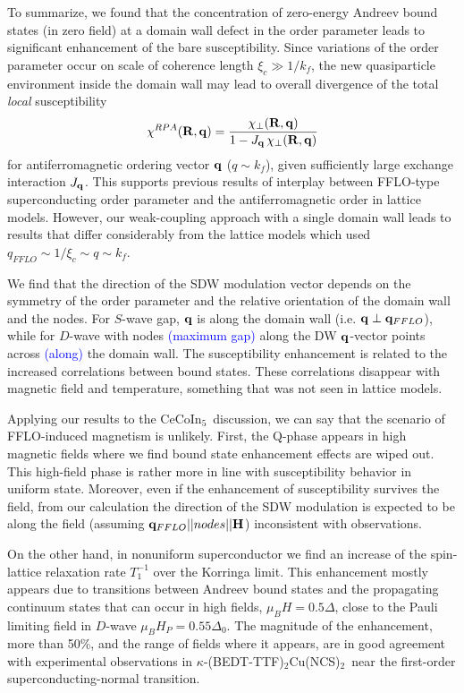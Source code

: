 \documentclass[prb,aps,showpacs,amsmath,twocolumn,10pt]{revtex4-1}
\newcommand{\blue}{\textcolor{blue}}
\newcommand{\red}{\textcolor{red}}
\newcommand{\cecoin}{CeCoIn$_5$}
\newcommand{\kbtf}{$\kappa$-(BEDT-TTF)$_2$Cu(NCS)$_2$}
\begin{document}
To summarize, we found that the concentration of zero-energy Andreev bound states (in zero field) at a domain wall 
defect in the order parameter leads to significant enhancement of the bare 
susceptibility. Since variations of the order parameter occur on scale of coherence length $\xi_c \gg 1/k_f$, 
the new quasiparticle environment inside the domain wall may lead to overall divergence of the total 
\emph{local} susceptibility
$$
\chi^{RPA}({\bf R},{\bf q}) = \frac{ \chi_\perp({\bf R},{\bf q})}{1 - J_{\bf q} \, \chi_\perp({\bf R},{\bf q}) }
$$
for antiferromagnetic ordering vector ${\bf q}$ ($q \sim k_f$), given sufficiently 
large exchange interaction $J_{\bf q}$. This supports previous results of interplay between FFLO-type  
superconducting order parameter and the antiferromagnetic order in lattice models.\cite{Yanase2009abs,Marcin2009}
However, our weak-coupling approach with a single domain wall leads to results that differ 
considerably from the lattice models which used $q_{FFLO} \sim 1/\xi_c \sim q \sim k_f$. 

We find that the direction of the SDW modulation vector depends on the symmetry of 
the order parameter and the relative orientation of the domain wall and the nodes. 
For $S$-wave gap, ${\bf q}$ is along the domain wall (i.e. ${\bf q} \perp {\bf q}_{FFLO}$), 
while for $D$-wave with nodes \blue{(maximum gap)} along the DW ${\bf q}$-vector points across \blue{(along)} the domain wall. 
The susceptibility enhancement is related to the increased correlations between 
bound states. 
These correlations disappear with magnetic field and temperature, something that was not seen in lattice models. 

Applying our results to the \cecoin\ discussion, we can say that the scenario of FFLO-induced magnetism 
is unlikely. First, the Q-phase appears in high magnetic fields\cite{cecoin5_Kenzelmann, cecoin5_Kenzelmann2} 
where we find bound state enhancement effects are wiped out. 
This high-field phase is rather more in line with susceptibility behavior in uniform state.\cite{sc_afm_kato,Rosemeyer2014} 
Moreover, even if the enhancement of susceptibility survives the field, 
from our calculation the direction of the SDW modulation is expected to be along the field 
(assuming ${\bf q}_{FFLO} || nodes || {\bf H}$) inconsistent with observations.\cite{Gerber2014}

On the other hand, in nonuniform superconductor we find an increase of the spin-lattice relaxation rate $T_1^{-1}$ 
over the Korringa limit. This enhancement mostly appears due to transitions 
between Andreev bound states and the propagating continuum states that can occur in high fields, 
$\mu_B H = 0.5 \Delta$, close to the Pauli limiting field in $D$-wave $\mu_B H_P = 0.55 \Delta_0$. 
The magnitude of the enhancement, more than 50\%, and the range of fields where it appears, 
are in good agreement with experimental observations in \kbtf\ near the first-order 
superconducting-normal transition.\cite{Mayaffre2014} 
\end{document}
